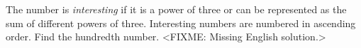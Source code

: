 \problem
The number is \emph{interesting} if it is a power of three or can be
represented as the sum of different powers of three.
Interesting numbers are numbered in ascending order.
Find the hundredth number.
\solution
<FIXME: Missing English solution.>
\endproblem
